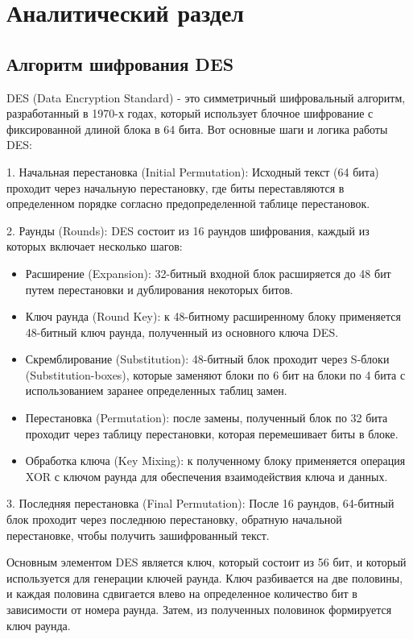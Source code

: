 \chapter{Аналитический раздел}
\label{cha:analysis}

\section{Алгоритм шифрования DES}

DES (Data Encryption Standard) - это симметричный шифровальный алгоритм, разработанный в 1970-х годах, который использует блочное шифрование с фиксированной длиной блока в 64 бита. Вот основные шаги и логика работы DES:

1. Начальная перестановка (Initial Permutation):
Исходный текст (64 бита) проходит через начальную перестановку, где биты переставляются в определенном порядке согласно предопределенной таблице перестановок.

2. Раунды (Rounds):
DES состоит из 16 раундов шифрования, каждый из которых включает несколько шагов:
\begin{itemize}
	\item Расширение (Expansion): 32-битный входной блок расширяется до 48 бит путем перестановки и дублирования некоторых битов.
	\item Ключ раунда (Round Key): к 48-битному расширенному блоку применяется 48-битный ключ раунда, полученный из основного ключа DES.
	\item Скремблирование (Substitution): 48-битный блок проходит через S-блоки (Substitution-boxes), которые заменяют блоки по 6 бит на блоки по 4 бита с использованием заранее определенных таблиц замен.
	\item Перестановка (Permutation):  после замены, полученный блок по 32 бита проходит через таблицу перестановки, которая перемешивает биты в блоке.
	\item Обработка ключа (Key Mixing): к полученному блоку применяется операция XOR с ключом раунда для обеспечения взаимодействия ключа и данных.
\end{itemize}

3. Последняя перестановка (Final Permutation):
После 16 раундов, 64-битный блок проходит через последнюю перестановку, обратную начальной перестановке, чтобы получить зашифрованный текст.

Основным элементом DES является ключ, который состоит из 56 бит, и который используется для генерации ключей раунда. Ключ разбивается на две половины, и каждая половина сдвигается влево на определенное количество бит в зависимости от номера раунда. Затем, из полученных половинок формируется ключ раунда.

